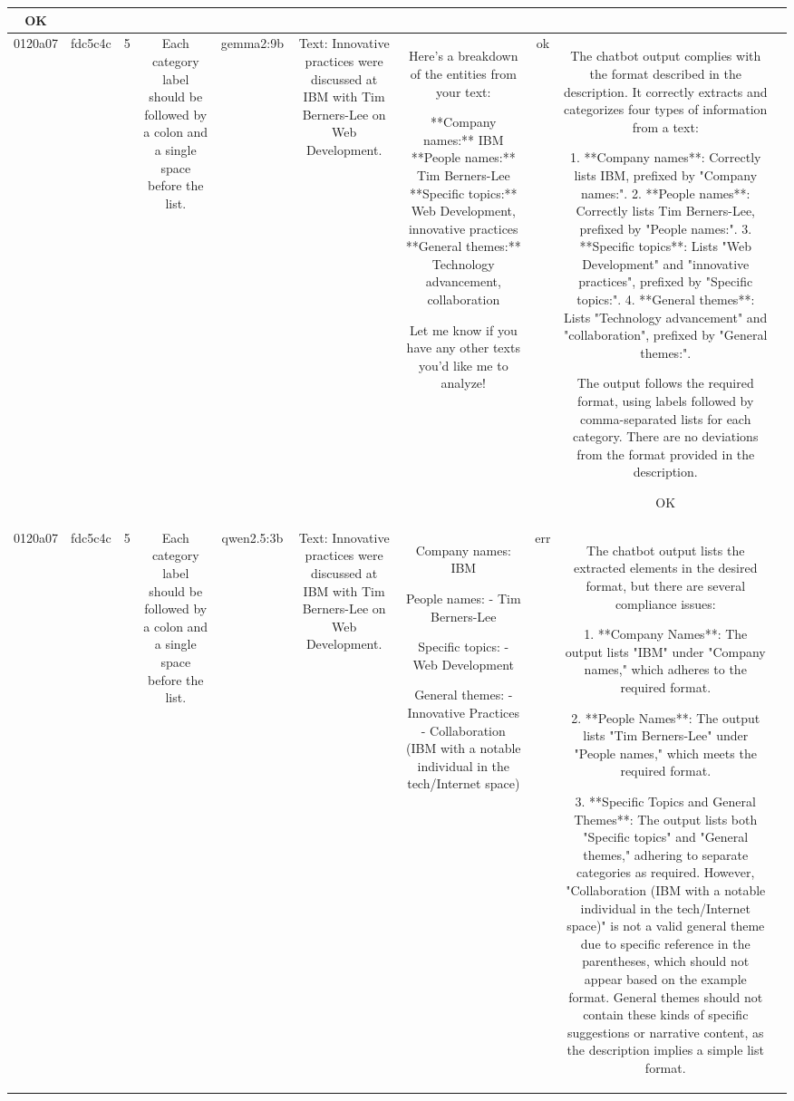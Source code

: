 \begin{table}[h!]
\begin{tabular}{|c|c|c|c|c|c|c|c|c|c|}
OK & \\
\hline
0120a07 & fdc5c4c & 5 & Each category label should be followed by a colon and a single space before the list. & gemma2:9b & Text: Innovative practices were discussed at IBM with Tim Berners-Lee on Web Development. & Here's a breakdown of the entities from your text:

**Company names:** IBM
**People names:** Tim Berners-Lee 
**Specific topics:** Web Development, innovative practices
**General themes:** Technology advancement, collaboration  


Let me know if you have any other texts you'd like me to analyze! 
 & ok & The chatbot output complies with the format described in the description. It correctly extracts and categorizes four types of information from a text:

1. **Company names**: Correctly lists IBM, prefixed by "Company names:".
2. **People names**: Correctly lists Tim Berners-Lee, prefixed by "People names:".
3. **Specific topics**: Lists "Web Development" and "innovative practices", prefixed by "Specific topics:".
4. **General themes**: Lists "Technology advancement" and "collaboration", prefixed by "General themes:".

The output follows the required format, using labels followed by comma-separated lists for each category. There are no deviations from the format provided in the description.

OK & \\
\hline
0120a07 & fdc5c4c & 5 & Each category label should be followed by a colon and a single space before the list. & qwen2.5:3b & Text: Innovative practices were discussed at IBM with Tim Berners-Lee on Web Development. & Company names: IBM

People names: 
- Tim Berners-Lee  

Specific topics: 
- Web Development

General themes:
- Innovative Practices  
- Collaboration (IBM with a notable individual in the tech/Internet space) & err & The chatbot output lists the extracted elements in the desired format, but there are several compliance issues:

1. **Company Names**: The output lists "IBM" under "Company names," which adheres to the required format.

2. **People Names**: The output lists "Tim Berners-Lee" under "People names," which meets the required format.

3. **Specific Topics and General Themes**: The output lists both "Specific topics" and "General themes," adhering to separate categories as required. However, "Collaboration (IBM with a notable individual in the tech/Internet space)" is not a valid general theme due to specific reference in the parentheses, which should not appear based on the example format. General themes should not contain these kinds of specific suggestions or narrative content, as the description implies a simple list format.


\end{tabular}
\end{table}
